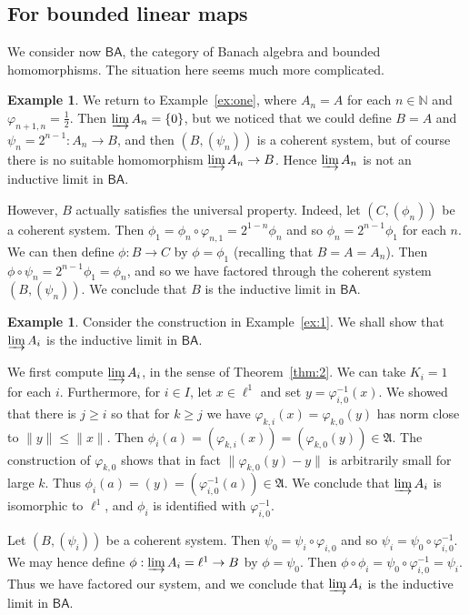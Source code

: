 \documentclass[a4paper,11pt]{article}
\newcommand{\mf}{\mathfrak}
\newcommand{\indlim}{\varinjlim}
\newcommand{\ba}{\textsf{BA}}
\theoremstyle{definition}
\newtheorem{example}[lemma]{Example}
\begin{document}
\subsection{For bounded linear maps}

We consider now $\ba$, the category of Banach algebra and bounded homomorphisms.  The situation here
seems much more complicated.

\begin{example}\label{ex:3}
We return to
Example~\ref{ex:one}, where $A_n=A$ for each $n\in\mathbb N$ and $\varphi_{n+1,n} = \frac12$.
Then $\indlim A_n = \{0\}$, but we noticed that we could define $B=A$ and $\psi_n =
2^{n-1}:A_n\rightarrow B$, and then $(B,(\psi_n))$ is a coherent system, but of course there is
no suitable homomorphism $\indlim A_n \rightarrow B$.  Hence $\indlim A_n$ is not an inductive
limit in $\ba$.

However, $B$ actually satisfies the universal property.  Indeed, let $(C,(\phi_n))$ be a coherent
system.  Then $\phi_1 = \phi_n \circ \varphi_{n,1} = 2^{1-n} \phi_n$ and so
$\phi_n = 2^{n-1} \phi_1$ for each $n$.  We can then define $\phi: B\rightarrow C$ by
$\phi = \phi_1$ (recalling that $B=A=A_n$).  Then $\phi\circ\psi_n = 2^{n-1}\phi_1
= \phi_n$, and so we have factored through the coherent system $(B,(\psi_n))$.  We conclude that
$B$ is the inductive limit in $\ba$.
\end{example}

\begin{example}
Consider the construction in Example~\ref{ex:1}.  We shall show that $\indlim A_i$ is the inductive
limit in $\ba$.

We first compute $\indlim A_i$, in the sense of Theorem~\ref{thm:2}.  We can take $K_i=1$ for each
$i$.  Furthermore, for $i\in I$, let $x\in\ell^1$ and set $y = \varphi_{i,0}^{-1}(x)$.  We showed
that there is $j\geq i$ so that for $k\geq j$ we have $\varphi_{k,i}(x) = \varphi_{k,0}(y)$ has
norm close to $\|y\| \leq \|x\|$.  Then $\phi_i(a) = (\varphi_{k,i}(x)) = (\varphi_{k,0}(y)) \in
\mf A$.  The construction of $\varphi_{k,0}$ shows that in fact $\| \varphi_{k,0}(y)-y\|$ is
arbitrarily small for large $k$.  Thus $\phi_i(a) = (y) = (\varphi_{i,0}^{-1}(a)) \in\mf A$.
We conclude that $\indlim A_i$ is isomorphic to $\ell^1$, and $\phi_i$ is identified with
$\varphi_{i,0}^{-1}$.

Let $(B,(\psi_i))$ be a coherent system.  Then $\psi_0 = \psi_i\circ\varphi_{i,0}$ and so
$\psi_i = \psi_0\circ\varphi_{i,0}^{-1}$.  We may hence define $\phi:\indlim A_i = \ell^1
\rightarrow B$ by $\phi = \psi_0$.  Then $\phi \circ \phi_i = \psi_0 \circ \varphi_{i,0}^{-1} =
\psi_i$.  Thus we have factored our system, and we conclude that $\indlim A_i$ is the inductive
limit in $\ba$.
\end{example}
\end{document}
